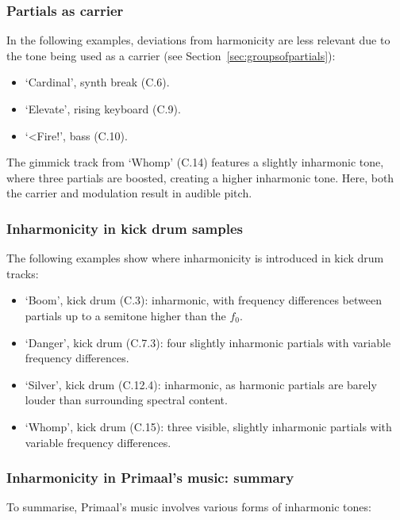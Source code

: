 \documentclass{article}
\begin{document}
\subsubsection{Partials as carrier}

In the following examples, deviations from harmonicity are less relevant due to the tone being used as a carrier (see Section~\ref{sec:groupsofpartials}):

\begin{itemize}[noitemsep]
    \item `Cardinal', synth break (C.6).
    \item `Elevate', rising keyboard (C.9).
    \item `<Fire!', bass (C.10).
\end{itemize}

The gimmick track from `Whomp' (C.14) features a slightly inharmonic tone, where three partials are boosted, creating a higher inharmonic tone. Here, both the carrier and modulation result in audible pitch.


\subsubsection{Inharmonicity in kick drum samples}

The following examples show where inharmonicity is introduced in kick drum tracks:

\begin{itemize}[noitemsep]
    \item `Boom', kick drum (C.3): inharmonic, with frequency differences between partials up to a semitone higher than the $f_0$.
    \item `Danger', kick drum (C.7.3): four slightly inharmonic partials with variable frequency differences.
    \item `Silver', kick drum (C.12.4): inharmonic, as harmonic partials are barely louder than surrounding spectral content.
    \item `Whomp', kick drum (C.15): three visible, slightly inharmonic partials with variable frequency differences.
\end{itemize}


\subsubsection{Inharmonicity in Primaal's music: summary}

To summarise, Primaal's music involves various forms of inharmonic tones:
\end{document}
